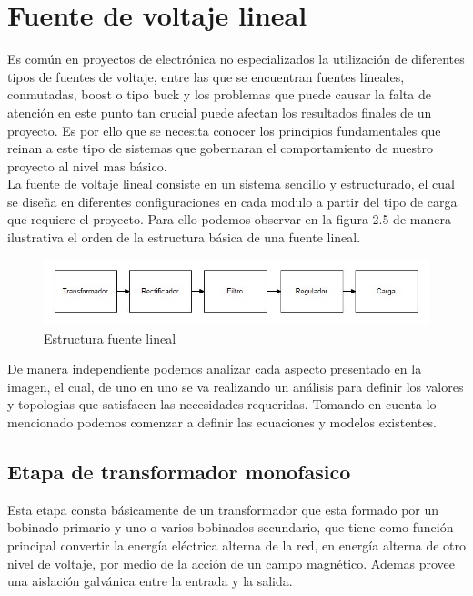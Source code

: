 \newpage
\section{Fuente de voltaje lineal}
Es común en proyectos de electrónica no especializados la utilización de diferentes tipos de fuentes de voltaje, entre las que se encuentran fuentes lineales, conmutadas, boost o tipo buck y los problemas que puede causar la falta de atención en este punto tan crucial puede afectan los resultados finales de un proyecto. Es por ello que se necesita conocer los principios fundamentales que reinan a este tipo de sistemas que gobernaran el comportamiento de nuestro proyecto al nivel mas básico.\\

La fuente de voltaje lineal consiste en un sistema sencillo y estructurado, el cual se diseña en diferentes configuraciones en cada modulo a partir del tipo de carga que requiere el proyecto. Para ello podemos observar en la figura 2.5 de manera ilustrativa el orden de la estructura básica de una fuente lineal.

\begin{figure}[H]
 \centering
 \includegraphics[width=12cm]{capitulo2/figs/fuentelineal.jpg}
 \caption{Estructura fuente lineal}
 \end{figure}
 
 De manera independiente podemos analizar cada aspecto presentado en la imagen, el cual, de uno en uno se va realizando un análisis para definir los valores y topologias que satisfacen las necesidades requeridas. Tomando en cuenta lo mencionado podemos comenzar a definir las ecuaciones y modelos existentes.
 \newpage

\subsection{Etapa de transformador monofasico}

Esta etapa consta básicamente de un transformador que esta formado por un bobinado primario y uno o varios bobinados secundario, que tiene como función principal
convertir la energía eléctrica alterna de la red, en energía alterna de otro nivel de voltaje, por medio de la acción de un campo magnético. Ademas provee una aislación galvánica entre la entrada y la salida.\\

